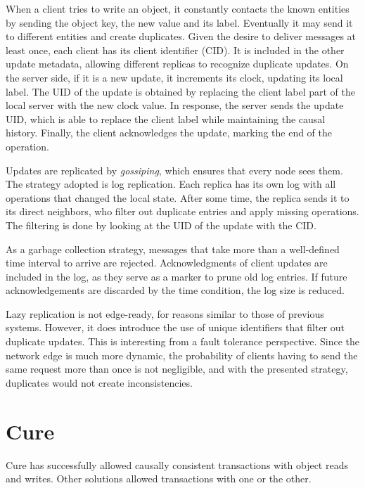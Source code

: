 When a client tries to write an object, it constantly contacts the known entities by sending the object key, the new value and its label. Eventually it may send it to different entities and create duplicates. Given the desire to deliver messages at least once, each client has its client identifier (CID). It is included in the other update metadata, allowing different replicas to recognize duplicate updates. On the server side, if it is a new update, it increments its clock, updating its local label. The UID of the update is obtained by replacing the client label part of the local server with the new clock value. In response, the server sends the update UID, which is able to replace the client label while maintaining the causal history. Finally, the client acknowledges the update, marking the end of the operation. 

Updates are replicated by \textit{gossiping}, which ensures that every node sees them. The strategy adopted is log replication. Each replica has its own log with all operations that changed the local state. After some time, the replica sends it to its direct neighbors, who filter out duplicate entries and apply missing operations. The filtering is done by looking at the UID of the update with the CID. 

As a garbage collection strategy, messages that take more than a well-defined time interval to arrive are rejected. Acknowledgments of client updates are included in the log, as they serve as a marker to prune old log entries. If future acknowledgements are discarded by the time condition, the log size is reduced. 

Lazy replication is not edge-ready, for reasons similar to those of previous systems. However, it does introduce the use of unique identifiers that filter out duplicate updates. This is interesting from a fault tolerance perspective. Since the network edge is much more dynamic, the probability of clients having to send the same request more than once is not negligible, and with the presented strategy, duplicates would not create inconsistencies.

\section{Cure}
\label{sec:soa:cure}

Cure \cite{akkoorath2016cure} has successfully allowed causally consistent transactions with object reads and writes. Other solutions allowed transactions with one or the other. 

